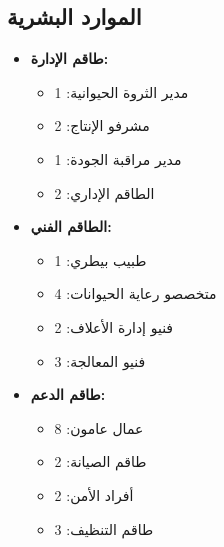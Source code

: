 \subsection{الموارد البشرية}
\begin{itemize}
    \item \textbf{طاقم الإدارة:}
    \begin{itemize}
        \item مدير الثروة الحيوانية: 1
        \item مشرفو الإنتاج: 2
        \item مدير مراقبة الجودة: 1
        \item الطاقم الإداري: 2
    \end{itemize}
    
    \item \textbf{الطاقم الفني:}
    \begin{itemize}
        \item طبيب بيطري: 1
        \item متخصصو رعاية الحيوانات: 4
        \item فنيو إدارة الأعلاف: 2
        \item فنيو المعالجة: 3
    \end{itemize}
    
    \item \textbf{طاقم الدعم:}
    \begin{itemize}
        \item عمال عامون: 8
        \item طاقم الصيانة: 2
        \item أفراد الأمن: 2
        \item طاقم التنظيف: 3
    \end{itemize}
\end{itemize}

